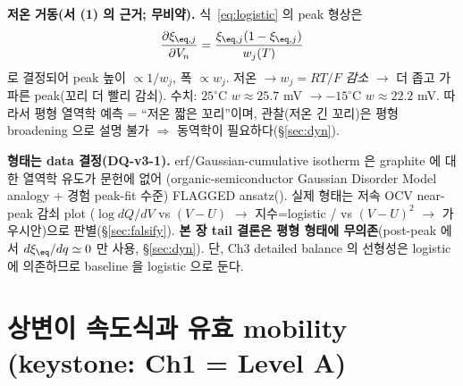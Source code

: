 \textbf{저온 거동(서 (1) 의 근거; 무비약).} 식~\eqref{eq:logistic} 의 peak 형상은
\begin{equation}
\frac{\partial\xi_{\eq,j}}{\partial V_n}=\frac{\xi_{\eq,j}(1-\xi_{\eq,j})}{w_j(T)}
\label{eq:dxidV}
\end{equation}
로 결정되어 peak 높이 $\propto 1/w_j$, 폭 $\propto w_j$. 저온 $\to w_j=RT/F$ \emph{감소} $\to$ 더 좁고
가파른 peak(꼬리 더 빨리 감쇠). 수치: $25^\circ$C $w\approx25.7$ mV $\to -15^\circ$C $w\approx22.2$ mV.
따라서 평형 열역학 예측 = ``저온 짧은 꼬리''이며, 관찰(저온 긴 꼬리)은 평형 broadening 으로 설명
불가 $\Rightarrow$ 동역학이 필요하다(\S\ref{sec:dyn}).
\begin{flagbox}
\textbf{형태는 data 결정(DQ-v3-1).} erf/Gaussian-cumulative isotherm 은 graphite 에 대한 열역학 유도가
문헌에 없어 (organic-semiconductor Gaussian Disorder Model \cite{baessler1993} analogy + 경험
peak-fit 수준) FLAGGED ansatz(). 실제 형태는 저속 OCV near-peak 감쇠 plot
($\log dQ/dV$ vs $(V-U)$ $\to$ 지수=logistic / vs $(V-U)^2$ $\to$ 가우시안)으로 판별(\S\ref{sec:falsify}).
\textbf{본 장 tail 결론은 평형 형태에 무의존}(post-peak 에서 $d\xi_\eq/dq\simeq0$ 만 사용,
\S\ref{sec:dyn}). 단, Ch3 detailed balance 의 선형성은 logistic 에 의존하므로 baseline 을 logistic 으로 둔다.
\end{flagbox}

\section{상변이 속도식과 유효 mobility (keystone: Ch1 = Level A)}\label{sec:rate}
